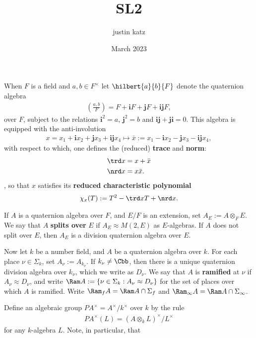 \documentclass{article}
\title{SL2}
\author{justin katz}
\date{March 2023}
\begin{document}
When $F$ is a field and $a,b \in F^\times$ let $\hilbert{a}{b}{F}$ denote the quaternion algebra
\begin{align*}
    \left(\frac{a, b}{F}\right) = F + \mathbf{i}F + \mathbf{j}F + \mathbf{ij}F,
\end{align*}
over $F$, subject to the relations $\mathbf{i}^2 = a $, $\mathbf{j}^2 = b$ and $\mathbf{ij}+\mathbf{ji} =0$. This algebra is equipped with the anti-involution
\begin{align*}
    x = x_1+\mathbf{i} x_2+\mathbf{j} x_3+\mathbf{i j} x_4 \mapsto \bar{x} := x_1-\mathbf{i} x_2-\mathbf{j} x_3-\mathbf{i} \mathbf{j} x_4,
\end{align*}
with respect to which, one defines the (reduced) \textbf{trace} and \textbf{norm}:
\begin{align*}
    \trd x & = x+\bar{x} \\
    \nrd x & = x\bar{x}.
\end{align*},
so that $x$ satisfies its \textbf{reduced characteristic polynomial}
\begin{align*}
    \chi_x(T) := T^2 -\trd x T + \nrd x.
\end{align*}


If $A$ is a quaternion algebra over $F$, and $E/F$ is an extension, set $A_E := A \otimes_F E$. We say that $A$ \textbf{splits over} $E$ if $A_E \approx M(2,E)$ as $E$-algebras. If $A$ does not split over $E$, then $A_E$ is a division quaternion algebra over $E$.

Now let $k$ be a number field, and $A$ be a quaternion algebra over $k$. For each place $\nu \in \Sigma_k$, set $A_\nu := A_{k_\nu}$. If $k_\nu \neq \Cbb$, then there is a unique quaternion division algebra over $k_\nu$, which we write as $D_\nu$. We say that $A$ is \textbf{ramified} at $\nu$ if $A_\nu \approx D_\nu$, and write $\Ram A : = \{ \nu \in \Sigma_k : A_\nu \approx D_\nu\}$ for the set of places over which $A$ is ramified. Write $\Ram_f A = \Ram A \cap \Sigma_f$ and $\Ram_\infty A = \Ram A \cap \Sigma_\infty$.

Define an algebraic group $PA^\times=A^\times/k^\times$ over $k$ by the rule
\begin{align*}
    PA^\times(L) = (A\otimes_k L)^\times/ L^\times
\end{align*}
for any $k$-algebra $L$. Note, in particular, that
\end{document}
